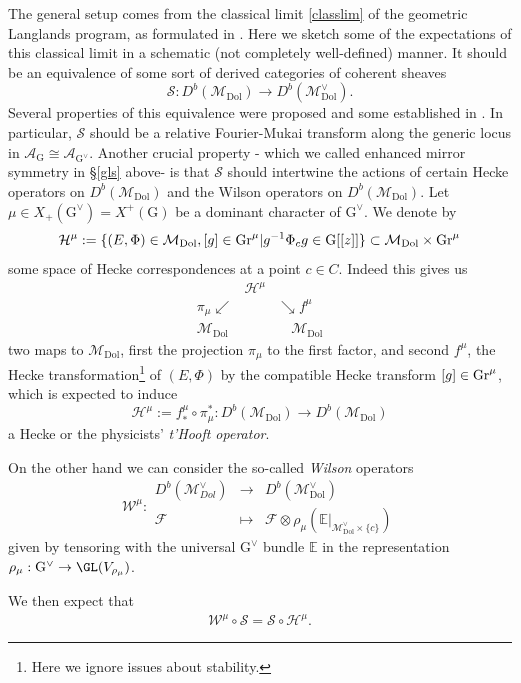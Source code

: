 \documentclass[12pt]{article}
\numberwithin{equation}{section}
\theoremstyle{remark}
\numberwithin{theorem}{section}
\def\beq{\begin{eqnarray}}
\def\eeq{\end{eqnarray}}
\def\bE{{\mathbb{E}}}
\def\M{{\mathcal{M}}}
\def\calA{{\mathcal{A}}}
\def\calF{{\mathcal{F}}}
\def\calH{\mathcal{H}}
\newcommand{\calK}{\mathcal{K}}
\newcommand{\Gr}{\textnormal{Gr}}
\newcommand{\G}{\mathrm{G}}
\newcommand{\Dol}{{\mathrm{Dol}}}
\numberwithin{equation}{section}
\begin{document}
The general setup comes from the classical limit \eqref{classlim} of the geometric Langlands program, as formulated 
in \cite{donagi-pantev}. Here we sketch some of the expectations of this classical limit in a schematic (not completely well-defined) manner.  It should be an equivalence of some sort of derived categories of coherent sheaves $$\mathscr{S}:D^b(\M_\Dol)\to D^b(\M_\Dol^\vee).$$ Several properties of this equivalence were proposed and some established in \cite{donagi-pantev}. In particular, $\mathscr{S}$ should be a relative Fourier-Mukai transform along the generic locus in $\calA_\G\cong \calA_{\G^\vee}$. Another  crucial property \cite{kapustin-witten} - which we called enhanced mirror symmetry in \S \ref{gls} above-  is that $\mathscr{S}$ should intertwine
the actions of certain Hecke operators on $D^b(\M_\Dol)$ and the Wilson operators on $D^b(\M_\Dol)$. Let $\mu\in X_+(\G^\vee)=X^+(\G)$ be a dominant character of $\G^\vee$. We denote by $$\calH^\mu:=\{(E,\Phi)\in \M_\Dol, [g]\in \Gr^\mu | g^{-1}\Phi_c g \in \G[[z]]\}\subset \M_\Dol\times \Gr^\mu$$ some space of Hecke correspondences at a point $c\in C$. Indeed this gives us $$\begin{array}{ccc} &\calH^\mu&\\ \pi_\mu\swarrow&&\searrow f^\mu \\\!\!\!\!\!\! \M_\Dol&&\,\,\,\,\,\, \M_\Dol \end{array}$$ two maps to $\M_\Dol$, first the projection $\pi_\mu$ to the first factor, and second $f^\mu$, the Hecke transformation\footnote{Here we ignore issues about stability.} of $(E,\Phi)$ by the compatible Hecke transform $[g]\in \Gr^\mu$,  which is expected to induce $$\mathscr{H}^\mu :=f^\mu_* \circ \pi_\mu^*: D^b(\M_\Dol)\to  D^b(\M_\Dol)$$ a Hecke or the physicists' {\em t'Hooft operator}. %

On the other hand we can consider the so-called {\em Wilson} operators $$\mathscr{W}^\mu : \begin{array}{ccc} D^b(\M^\vee_{Dol}) &\to& D^b(\M^\vee_\Dol) \\ \calF &\mapsto& \calF\otimes \rho_\mu(\bE|_{\M^\vee_{\Dol}\times \{c\}}) \end{array} $$ given by tensoring with the  universal $\G^\vee$ bundle $\bE$ in the representation $\rho_\mu: \G^\vee\to \GL(V_{\rho_\mu})$. 


We then expect \cite{donagi-pantev,kapustin-witten} that \beq\label{intertwine}\mathscr{W}^\mu \circ \mathscr{S} = \mathscr{S} \circ \mathscr{H}^\mu.\eeq
\end{document}
